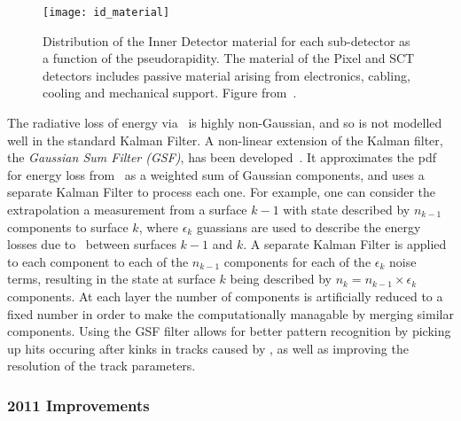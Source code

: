\begin{figure}[h]
\centering
            \texttt{[image: id\_material]}
\caption{
Distribution of the Inner Detector material for each sub-detector as a
function of the pseudorapidity. The material of the Pixel and SCT detectors
includes passive material arising from electronics, cabling, cooling and
mechanical support. Figure from~\cite{ATLAS-CONF-2012-047}.}
\label{fig:id-material}
\end{figure}


The radiative loss of energy via \brem\ is highly non-Gaussian, and so is not
modelled well in the standard Kalman Filter. A non-linear extension of the
Kalman filter, the {\it Gaussian Sum Filter (GSF)}, has been
developed~\cite{Fruhwirth2003131,Atkinson:1448253}. It
approximates the pdf for energy loss from \brem\ as a weighted sum of Gaussian
components, and uses a separate Kalman Filter to process each one. For example,
one can consider the extrapolation a measurement from a surface $k-1$ with state
described by $n_{k-1}$ components to surface $k$, where $\epsilon_{k}$ guassians
are used to describe the energy losses due to \brem\ between surfaces $k-1$ and
$k$. A separate Kalman Filter is applied to each component to each of the $n_{k-1}$
components for each of the $\epsilon_{k}$ noise terms, resulting in the state at
surface $k$ being described by $n_{k} = n_{k-1} \times \epsilon_{k}$ components.
At each layer the number of components is artificially reduced to a fixed number
in order to make the computationally managable by merging similar components.
Using the GSF filter allows for better pattern recognition by picking up hits
occuring after kinks in tracks caused by \brem, as well as improving the
resolution of the track parameters.

\subsubsection{2011 Improvements}

